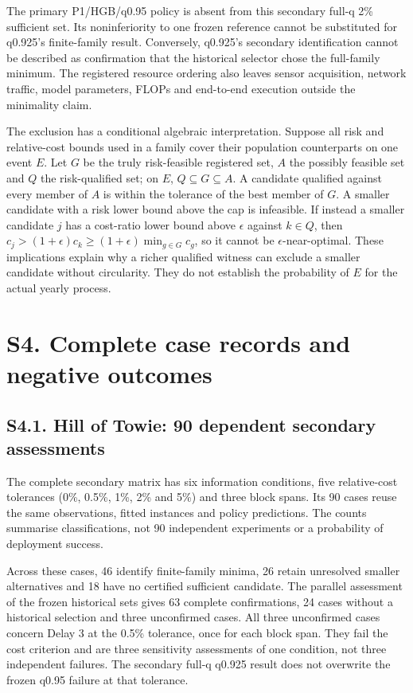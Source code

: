 \documentclass[
  british,
  11pt,
]{article}
\begin{document}
The primary P1/HGB/q0.95 policy is absent from this secondary full-q 2\%
sufficient set. Its noninferiority to one frozen reference cannot be
substituted for q0.925's finite-family result. Conversely, q0.925's
secondary identification cannot be described as confirmation that the
historical selector chose the full-family minimum. The registered
resource ordering also leaves sensor acquisition, network traffic, model
parameters, FLOPs and end-to-end execution outside the minimality claim.

The exclusion has a conditional algebraic interpretation. Suppose all
risk and relative-cost bounds used in a family cover their population
counterparts on one event \(E\). Let \(G\) be the truly risk-feasible
registered set, \(A\) the possibly feasible set and \(Q\) the
risk-qualified set; on \(E\), \(Q\subseteq G\subseteq A\). A candidate
qualified against every member of \(A\) is within the tolerance of the
best member of \(G\). A smaller candidate with a risk lower bound above
the cap is infeasible. If instead a smaller candidate \(j\) has a
cost-ratio lower bound above \(\epsilon\) against \(k\in Q\), then
\(c_j>(1+\epsilon)c_k\geq(1+\epsilon)\min_{g\in G}c_g\), so it cannot be
\(\epsilon\)-near-optimal. These implications explain why a richer
qualified witness can exclude a smaller candidate without circularity.
They do not establish the probability of \(E\) for the actual yearly
process.

\section{S4. Complete case records and negative
outcomes}\label{s4.-complete-case-records-and-negative-outcomes}

\subsection{S4.1. Hill of Towie: 90 dependent secondary
assessments}\label{s4.1.-hill-of-towie-90-dependent-secondary-assessments}

The complete secondary matrix has six information conditions, five
relative-cost tolerances (0\%, 0.5\%, 1\%, 2\% and 5\%) and three block
spans. Its 90 cases reuse the same observations, fitted instances and
policy predictions. The counts summarise classifications, not 90
independent experiments or a probability of deployment success.

Across these cases, 46 identify finite-family minima, 26 retain
unresolved smaller alternatives and 18 have no certified sufficient
candidate. The parallel assessment of the frozen historical sets gives
63 complete confirmations, 24 cases without a historical selection and
three unconfirmed cases. All three unconfirmed cases concern Delay 3 at
the 0.5\% tolerance, once for each block span. They fail the cost
criterion and are three sensitivity assessments of one condition, not
three independent failures. The secondary full-q q0.925 result does not
overwrite the frozen q0.95 failure at that tolerance.
\end{document}
